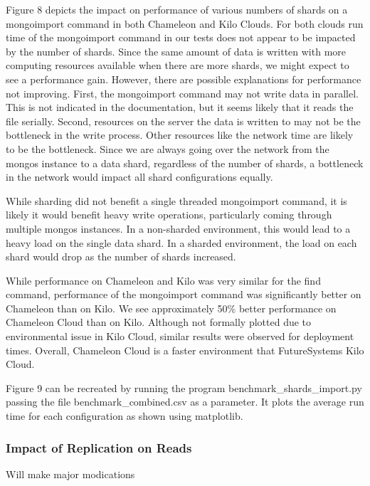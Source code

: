 \documentclass[9pt,twocolumn,twoside]{../../styles/osajnl}
\begin{document}
Figure 8 depicts the impact on performance of various numbers of shards on a mongoimport command in both Chameleon and Kilo Clouds.  For both clouds run time of the mongoimport command in our tests does not appear to be  impacted by the number of shards.  Since the same amount of data is written with more computing resources available when there are more shards, we might expect to see a performance gain.  However, there are possible explanations for performance not improving.  First, the mongoimport command may not write data in parallel.  This is not indicated in the documentation, but it seems likely that it reads the file serially.  Second, resources on the server the data is written to may not be the bottleneck in the write process.  Other resources like the network time are likely to be the bottleneck.  Since we are always going over the network from the mongos instance to a data shard, regardless of the number of shards, a bottleneck in the network would impact all shard configurations equally.

While sharding did not benefit a single threaded mongoimport command, it is likely it would benefit heavy write operations, particularly coming through multiple mongos instances.  In a non-sharded environment, this would lead to a heavy load on the single data shard.  In a sharded environment, the load on each shard would drop as the number of shards increased.

While performance on Chameleon and Kilo was very similar for the find command, performance of the mongoimport command was significantly better on Chameleon than on Kilo.  We see approximately 50\% better performance on Chameleon Cloud than on Kilo.  Although not formally plotted due to environmental issue in Kilo Cloud, similar results were observed for deployment times.  Overall, Chameleon Cloud is a faster environment that FutureSystems Kilo Cloud.

Figure 9 can be recreated by running the program benchmark\_shards\_import.py passing the file benchmark\_combined.csv as a parameter.  It plots the average run time for each configuration as shown using matplotlib.




\subsubsection{Impact of Replication on Reads}

Will make major modications
\end{document}
